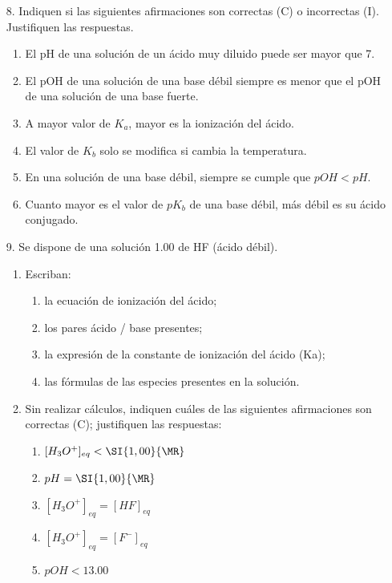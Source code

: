 \documentclass[../Práctica.root.tex]{subfiles}
\begin{document}
\begin{enumerate}
    \item[8.] Indiquen si las siguientes afirmaciones son correctas (C) o incorrectas (I). Justifiquen las
          respuestas.
          \begin{enumerate}
              \item El pH de una solución de un ácido muy diluido puede ser mayor que 7.
              \item El pOH de una solución de una base débil siempre es menor que el pOH de una solución de una base fuerte.
              \item A mayor valor de $K_a$, mayor es la ionización del ácido.
              \item El valor de $K_b$ solo se modifica si cambia la temperatura.
              \item En una solución de una base débil, siempre se cumple que $pOH < pH$.
              \item Cuanto mayor es el valor de $pK_b$ de una base débil, más débil es su ácido conjugado.
          \end{enumerate}

    \item[9.] Se dispone de una solución \SI{1,00}{\MR} de HF (ácido débil).
          \begin{enumerate}
              \item Escriban:
                    \begin{enumerate}
                        \item la ecuación de ionización del ácido;
                        \item los pares ácido / base presentes;
                        \item la expresión de la constante de ionización del ácido (Ka);
                        \item las fórmulas de las especies presentes en la solución.
                    \end{enumerate}
              \item Sin realizar cálculos, indiquen cuáles de las siguientes afirmaciones son correctas
                    (C); justifiquen las respuestas:
                    \begin{enumerate}
                        \item $[H_3O^+]_{eq} < \SI{1,00}{\MR}$
                        \item $pH = \SI{1,00}{\MR}$
                        \item $[H_3O^+]_{eq} = [HF]_{eq}$
                        \item $[H_3O^+]_{eq} = [F^-]_{eq}$
                        \item $pOH < \num{13,00}$
                    \end{enumerate}
          \end{enumerate}


\end{enumerate}
\end{document}
